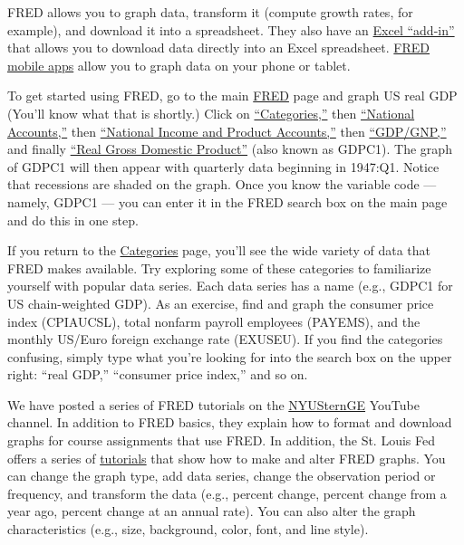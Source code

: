FRED  allows you to graph data, transform it (compute growth rates, for example),
 and download it into a spreadsheet.
They also have an \href{http://research.stlouisfed.org/fred-addin/}{Excel ``add-in''}
that allows you to download data directly into an Excel spreadsheet.
\href{http://research.stlouisfed.org/fred-mobile/}{FRED mobile apps} allow
you to graph data on your phone or tablet.

To get started using FRED, go to the main \href{http://research.stlouisfed.org/fred2}{FRED} page
and graph US real GDP
(You'll know what that is shortly.)
Click on \href{http://research.stlouisfed.org/fred2/categories}{``Categories,''} then \href{http://research.stlouisfed.org/fred2/categories/32992}{``National Accounts,''} then \href{http://research.stlouisfed.org/fred2/categories/18}{``National Income and Product Accounts,''} then \href{http://research.stlouisfed.org/fred2/categories/106}{``GDP/GNP,''} and finally \href{http://research.stlouisfed.org/fred2/series/GDPC1?cid=106}{``Real Gross Domestic Product''}
(also known as GDPC1). The graph of GDPC1 will then appear with quarterly data beginning in 1947:Q1. Notice that recessions are shaded on the graph.
Once you know the variable code --- namely, GDPC1 --- you can enter it in the FRED search box
on the main page and do this in one step.

If you return to the \href{http://research.stlouisfed.org/fred2/categories}{Categories} page,
you'll see the wide variety of data that FRED makes available.
Try exploring some of these categories to familiarize yourself with popular data series.
Each data series has a name (e.g., GDPC1 for US chain-weighted GDP). As an exercise, find and graph the consumer price index 
 (CPIAUCSL), total nonfarm payroll employees (PAYEMS), and the monthly US/Euro foreign exchange rate (EXUSEU).
If you find the categories confusing, simply type what you're looking for into the search box
on the upper right:  ``real GDP,'' ``consumer price index,'' and so on.

We have posted a series of FRED tutorials on the
\href{http://www.youtube.com/user/NYUSternGE}{NYUSternGE}
YouTube channel.
In addition to FRED basics, they explain how to format and download graphs for course
assignments that use FRED.
In addition, the St. Louis Fed offers
a series of \href{http://research.stlouisfed.org/tutorials/fredgraph/}{tutorials}
that show how to make and alter FRED graphs.
You can change the graph type, add data series, change the observation period or frequency, and transform the data (e.g., percent change, percent change from a year ago, percent change at an annual rate). You can also alter the graph characteristics (e.g., size, background, color, font, and line style).

